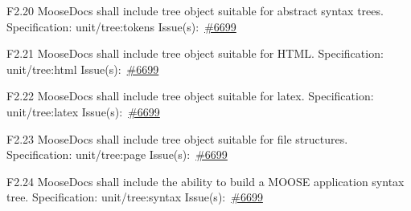 \begin{Requirement}{F2.20}
MooseDocs shall include tree object suitable for abstract syntax trees.
\newline
Specification: unit/tree:tokens
\newline
Issue(s):~\href{https://github.com/idaholab/moose/issues/6699}{\#6699}
\end{Requirement}

\begin{Requirement}{F2.21}
MooseDocs shall include tree object suitable for HTML.
\newline
Specification: unit/tree:html
\newline
Issue(s):~\href{https://github.com/idaholab/moose/issues/6699}{\#6699}
\end{Requirement}

\begin{Requirement}{F2.22}
MooseDocs shall include tree object suitable for latex.
\newline
Specification: unit/tree:latex
\newline
Issue(s):~\href{https://github.com/idaholab/moose/issues/6699}{\#6699}
\end{Requirement}

\begin{Requirement}{F2.23}
MooseDocs shall include tree object suitable for file structures.
\newline
Specification: unit/tree:page
\newline
Issue(s):~\href{https://github.com/idaholab/moose/issues/6699}{\#6699}
\end{Requirement}

\begin{Requirement}{F2.24}
MooseDocs shall include the ability to build a MOOSE application syntax tree.
\newline
Specification: unit/tree:syntax
\newline
Issue(s):~\href{https://github.com/idaholab/moose/issues/6699}{\#6699}
\end{Requirement}
